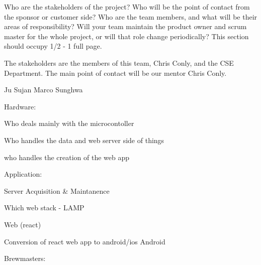 Who are the stakeholders of the project? Who will be the point of contact from the sponsor or customer side? Who are the team members, and what will be their areas of responsibility? Will your team maintain the product owner and scrum master for the whole project, or will that role change periodically? This section should occupy 1/2 - 1 full page.


The stakeholders are the members of this team, Chris Conly, and the CSE Department. The main point of contact will be our mentor Chris Conly.

\vspace{5mm}




Ju
Sujan
Marco
Sunghwa


Hardware:
  

Who deals mainly with the microcontoller 

Who handles the data and web server side of things

who handles the creation of the web app

Application:

  Server Acquisition & Maintanence

         Which web stack - LAMP
  
         Web (react)
         
  Conversion of react web app to android/ios
  Android



Brewmasters: